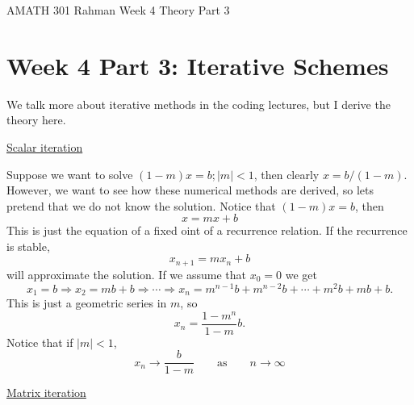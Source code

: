 \documentclass[reqno]{amsart}
\theoremstyle{definition}
\begin{document}
\begin{flushleft}
{\sc \Large AMATH 301 Rahman} \hfill Week 4 Theory Part 3
\bigskip
\end{flushleft}

\newcommand{\R}{\mathbb{R}}
\newcommand{\N}{\mathbb{N}}
\newcommand{\Z}{\mathbb{Z}}
\newcommand{\Q}{\mathbb{Q}}
\renewcommand{\CancelColor}{\color{red}}
\newcommand{\?}{\stackrel{?}{=}}
\renewcommand{\varphi}{\phi}
\newcommand{\card}{\text{Card}}
\newcommand{\bigzero}{\text{\Huge 0}}
\newcommand{\curvearrowdown}{{\color{red}\rotatebox{90}{$\curvearrowleft$}}}
\newcommand{\curvearrowup}{{\color{red}\rotatebox{90}{$\curvearrowright$}}}



\section*{Week 4 Part 3:  Iterative Schemes}

We talk more about iterative methods in the coding lectures, but I derive the theory here.

\underline{\color{blue}Scalar iteration}

Suppose we want to solve $(1-m)x = b; |m| < 1$, then clearly $x = b/(1-m)$.  However, we want to see how these numerical methods are derived, so lets pretend that we do not know the solution.  Notice that $(1-m)x = b$, then
%
\begin{equation}
x = mx + b
\end{equation}
%
This is just the equation of a fixed oint of a recurrence relation.  If the recurrence is stable,
%
\begin{equation}
x_{n+1} = mx_n + b
\end{equation}
%
will approximate the solution.  If we assume that $x_0 = 0$ we get
%
\begin{equation*}
x_1 = b \Rightarrow x_2 = mb + b \Rightarrow \cdots \Rightarrow x_n = m^{n-1}b + m^{n-2}b + \cdots + m^2b + mb + b.
\end{equation*}
%
This is just a geometric series in $m$, so
%
\begin{equation}
x_n = \frac{1-m^n}{1-m}b.
\end{equation}
%
Notice that if $|m| < 1$,
%
\begin{equation*}
x_n \rightarrow \frac{b}{1-m} \qquad \text{as} \qquad n \rightarrow \infty
\end{equation*}

\bigskip

\underline{\color{blue}Matrix iteration}
\end{document}
